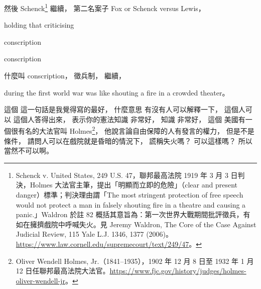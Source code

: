 \hypertarget{w06:cue:2405}{}然後 Schenck\footnote{Schenck v. United States, 249 U.S. 47，聯邦最高法院 1919 年 3 月 3 日判決，Holmes 大法官主筆，提出「明顯而立即的危險」（clear and present danger）標準；判決理由謂「The most stringent protection of free speech would not protect a man in falsely shouting fire in a theatre and causing a panic.」Waldron 於註 82 概括其意旨為：第一次世界大戰期間批評徵兵，有如在擁擠戲院中呼喊失火。見 Jeremy Waldron, The Core of the Case Against Judicial Review, 115 Yale L.J. 1346, 1377 (2006)。\url{https://www.law.cornell.edu/supremecourt/text/249/47}。} 繼續，
\hypertarget{w06:cue:2406}{}第二名案子 Fox or Schenck versus Lewis，

\hypertarget{w06:cue:2407}{}holding that criticising

\hypertarget{w06:cue:2408}{}conscription

\hypertarget{w06:cue:2409}{}conscription

\hypertarget{w06:cue:2410}{}什麼叫 conscription，
\hypertarget{w06:cue:2411}{}徵兵制，
\hypertarget{w06:cue:2412}{}繼續，

\hypertarget{w06:cue:2413}{}during the first world war
\hypertarget{w06:cue:2414}{}was like shouting a fire in a crowded theater。

\hypertarget{w06:cue:2415}{}這個 這一句話是我覺得寫的最好，
\hypertarget{w06:cue:2416}{}什麼意思 有沒有人可以解釋一下，
\hypertarget{w06:cue:2417}{}這個人可以 這個人答得出來，
\hypertarget{w06:cue:2418}{}表示你的憲法知識 非常好，
\hypertarget{w06:cue:2419}{}知識 非常好，
\hypertarget{w06:cue:2420}{}這個 美國有一個很有名的大法官叫 Holmes\footnote{Oliver Wendell Holmes, Jr.（1841–1935），1902 年 12 月 8 日至 1932 年 1 月 12 日任聯邦最高法院大法官。\url{https://www.fjc.gov/history/judges/holmes-oliver-wendell-jr}。}，
\hypertarget{w06:cue:2421}{}他說言論自由保障的人有發言的權力，
\hypertarget{w06:cue:2422}{}但是不是條件，
\hypertarget{w06:cue:2423}{}請問人可以在戲院就是昏暗的情況下，
\hypertarget{w06:cue:2424}{}謊稱失火嗎？
\hypertarget{w06:cue:2425}{}可以這樣嗎？
\hypertarget{w06:cue:2426}{}所以當然不可以啊。

